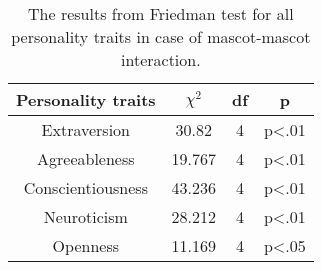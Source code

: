 \begin{table}[!htb]
    \renewcommand{\arraystretch}{1}
    \begin{center}
        \begin{tabular}{|c|c|c|c|}
            \hline
            \textbf{Personality traits} & \textbf{$\chi^2$} & \textbf{df} & \textbf{p} \\
            \hline
            Extraversion &30.82 &4 &p<.01 \\
            \hline
            Agreeableness &19.767 &4 &p<.01 \\
            \hline
            Conscientiousness & 43.236 &4 &p<.01 \\
            \hline
            Neuroticism &28.212 &4 &p<.01\\
            \hline
            Openness &11.169 &4 &p<.05 \\
            \hline
        \end{tabular}
        \caption{The results from Friedman test for all personality traits in case of mascot-mascot interaction.}
        \label{table:friedmanMM1}
    \end{center}
\end{table}


